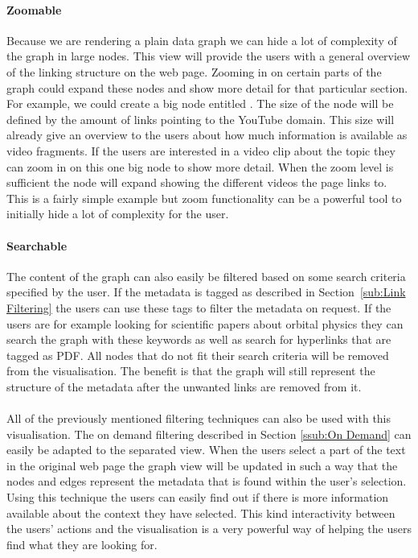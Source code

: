 	\paragraph{Zoomable}
	Because we are rendering a plain data graph we can hide a lot of complexity of the graph in large nodes. This view will provide the users with a general overview of the linking structure on the web page. Zooming in on certain parts of the graph could expand these nodes and show more detail for that particular section. For example, we could create a big node entitled . The size of the node will be defined by the amount of links pointing to the YouTube domain. This size will already give an overview to the users about how much information is available as video fragments. If the users are interested in a video clip about the topic they can zoom in on this one big node to show more detail. When the zoom level is sufficient the node will expand showing the different videos the page links to. This is a fairly simple example but zoom functionality can be a powerful tool to initially hide a lot of complexity for the user.
	\paragraph{Searchable}
	The content of the graph can also easily be filtered based on some search criteria specified by the user. If the metadata is tagged as described in Section~\ref{sub:Link Filtering} the users can use these tags to filter the metadata on request. If the users are for example looking for scientific papers about orbital physics they can search the graph with these keywords as well as search for hyperlinks that are tagged as PDF. All nodes that do not fit their search criteria will be removed from the visualisation. The benefit is that the graph will still represent the structure of the metadata after the unwanted links are removed from it.
	\paragraph{}
	All of the previously mentioned filtering techniques can also be used with this visualisation. The on demand filtering described in Section \ref{ssub:On Demand} can easily be adapted to the separated view. When the users select a part of the text in the original web page the graph view will be updated in such a way that the nodes and edges represent the metadata that is found within the user's selection. Using this technique the users can easily find out if there is more information available about the context they have selected. This kind interactivity between the users' actions and the visualisation is a very powerful way of helping the users find what they are looking for.
